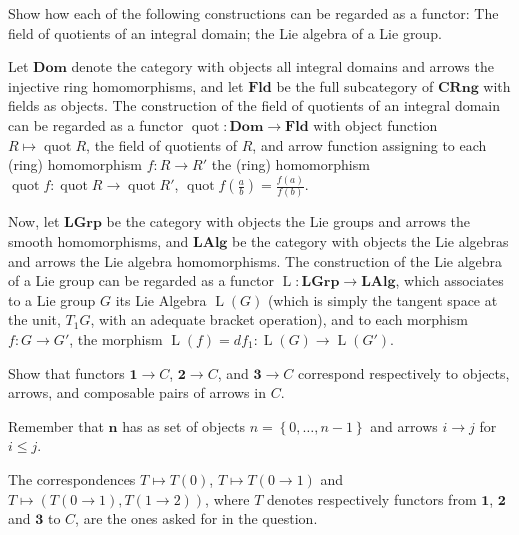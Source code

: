 \begin{exercise}
Show how each of the following constructions can be regarded as a functor: The field of quotients of an integral domain; the Lie algebra of a Lie group.
\end{exercise}
\begin{solution}
Let $\mathbf{Dom}$ denote the category with objects all integral domains and arrows the injective ring homomorphisms, and let $\mathbf{Fld}$ be the full subcategory of $\mathbf{CRng}$ with fields as objects. The construction of the field of quotients of an integral domain can be regarded as a functor $\operatorname{quot}:\mathbf{Dom}\to\mathbf{Fld}$ with object function $R\mapsto \operatorname{quot}R$, the field of quotients of $R$, and arrow function assigning to each (ring) homomorphism $f:R\to R'$ the (ring) homomorphism $\operatorname{quot}f:\operatorname{quot}R\to\operatorname{quot}R'$, $\operatorname{quot}f(\frac{a}{b})=\frac{f(a)}{f(b)}$.

Now, let $\mathbf{LGrp}$ be the category with objects the Lie groups and arrows the smooth homomorphisms, and $\mathbf{LAlg}$ be the category with objects the Lie algebras and arrows the Lie algebra homomorphisms. The construction of the Lie algebra of a Lie group can be regarded as a functor $\operatorname{L}:\mathbf{LGrp}\to\mathbf{LAlg}$, which associates to a Lie group $G$ its Lie Algebra $\operatorname{L}(G)$ (which is simply the tangent space at the unit, $T_1G$, with an adequate bracket operation), and to each morphism $f:G\to G'$, the morphism $\operatorname{L}(f)=df_1:\operatorname{L}(G)\to\operatorname{L}(G')$.
\end{solution}

\begin{exercise}
Show that functors $\mathbf{1}\to C$, $\mathbf{2}\to C$, and $\mathbf{3}\to C$ correspond respectively to objects, arrows, and composable pairs of arrows in $C$.
\end{exercise}
\begin{solution}
Remember that $\mathbf{n}$ has as set of objects $n=\left\{0,\ldots,n-1\right\}$ and arrows $i\to j$ for $i\leq j$.

The correspondences $T\mapsto T(0)$, $T\mapsto T(0\to 1)$ and $T\mapsto (T(0\to 1),T(1\to 2))$, where $T$ denotes respectively functors from $\mathbf{1}$, $\mathbf{2}$ and $\mathbf{3}$ to $C$, are the ones asked for in the question.
\end{solution}

